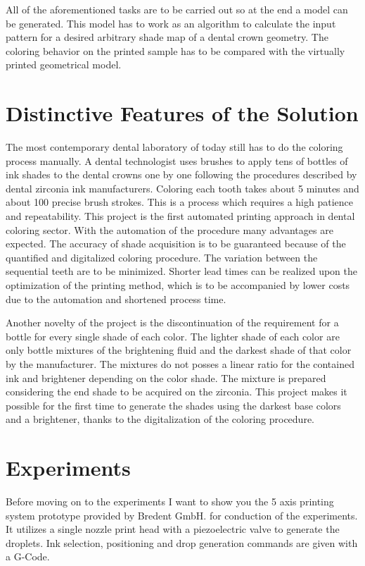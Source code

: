  All of the aforementioned tasks are to be carried out so at the end a model can be generated. This model has to work as an algorithm to calculate the input pattern for a desired arbitrary shade map of a dental crown geometry. The coloring behavior on the printed sample has to be compared with the virtually printed geometrical model.
 

\chapter{Distinctive Features of the Solution}
\label{sec:Unterscheidungsmerkmale}
The most contemporary dental laboratory of today still has to do the coloring process manually. A dental technologist uses brushes to apply tens of bottles of ink shades to the dental crowns one by one following the procedures described by dental zirconia ink manufacturers. Coloring each tooth takes about 5 minutes and about 100 precise brush strokes. This is a process which requires a high patience and repeatability. This project is the first automated printing approach in dental coloring sector. With the automation of the procedure many advantages are expected. The accuracy of shade acquisition is to be guaranteed because of the quantified and digitalized coloring procedure. The variation between the sequential teeth are to be minimized. Shorter lead times can be realized upon the optimization of the printing method, which is to be accompanied by lower costs due to the automation and shortened process time.

Another novelty of the project is the discontinuation of the requirement for a bottle for every single shade of each color. The lighter shade of each color are only bottle mixtures of the brightening fluid and the darkest shade of that color by the manufacturer. The mixtures do not posses a linear ratio for the contained ink and brightener depending on the color shade. The mixture is prepared considering the end shade to be acquired on the zirconia. This project makes it possible for the first time to generate the shades using the darkest base colors and a brightener, thanks to the digitalization of the coloring procedure.

\chapter{Experiments}

Before moving on to the experiments I want to show you the 5 axis printing system prototype provided by Bredent GmbH. for conduction of the experiments. 
It utilizes a single nozzle print head with a piezoelectric valve to generate the droplets. Ink selection, positioning and drop generation commands are given with a G-Code.

